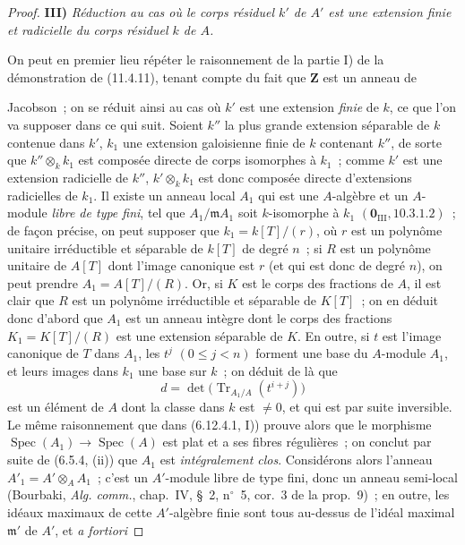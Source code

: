 \begin{proof}
\medskip
\noindent\textbf{III)} \emph{Réduction au cas où le corps résiduel $k'$ de
$A'$ est une extension finie et radicielle du corps résiduel $k$ de $A$.}

On peut en premier lieu répéter le raisonnement de la partie I) de la
démonstration de (11.4.11), tenant compte du fait que $\mathbf Z$ est un anneau
de


Jacobson~; on se réduit ainsi au cas où $k'$ est une extension \emph{finie} de
$k$, ce que l'on va supposer dans ce qui suit. Soient $k''$ la plus grande
extension séparable de $k$ contenue dans $k'$, $k_1$ une extension galoisienne
finie de $k$ contenant $k''$, de sorte que $k''\otimes_k k_1$ est composée
directe de corps isomorphes à $k_1$~; comme $k'$ est une extension radicielle de
$k''$, $k'\otimes_k k_1$ est donc composée directe d'extensions radicielles de
$k_1$. Il existe un anneau local $A_1$ qui est une $A$-algèbre et un $A$-module
\emph{libre de type fini}, tel que $A_1/\mathfrak m A_1$ soit $k$-isomorphe à
$k_1$ $(\mathbf 0_{\mathrm{III}},10.3.1.2)$~; de façon précise, on peut supposer
que $k_1=k[T]/(r)$, où $r$ est un polynôme unitaire irréductible et séparable de
$k[T]$ de degré $n$~; si $R$ est un polynôme unitaire de $A[T]$ dont l'image
canonique est $r$ (et qui est donc de degré $n$), on peut prendre
$A_1=A[T]/(R)$. Or, si $K$ est le corps des fractions de $A$, il est clair que
$R$ est un polynôme irréductible et séparable de $K[T]$~; on en déduit donc
d'abord que $A_1$ est un anneau intègre dont le corps des fractions
$K_1=K[T]/(R)$ est une extension séparable de $K$. En outre, si $t$ est l'image
canonique de $T$ dans $A_1$, les $t^j$ $(0\leq j<n)$ forment une base du
$A$-module $A_1$, et leurs images dans $k_1$ une base sur $k$~; on déduit de là
que
\[
d=\det\bigl(\operatorname{Tr}_{A_1/A}(t^{i+j})\bigr)
\]
est un élément de $A$ dont la classe dans $k$ est $\ne0$, et qui est par suite
inversible. Le même raisonnement que dans (6.12.4.1, I)) prouve alors que le
morphisme $\operatorname{Spec}(A_1)\to\operatorname{Spec}(A)$ est plat et a ses
fibres régulières~; on conclut par suite de (6.5.4, (ii)) que $A_1$ est
\emph{intégralement clos}. Considérons alors l'anneau
$A'_1=A'\otimes_A A_1$~; c'est un $A'$-module libre de type fini, donc un anneau
semi-local (Bourbaki, \emph{Alg. comm.}, chap.~IV, \S~2, n$^\circ$~5, cor.~3 de
la prop.~9)~; en outre, les idéaux maximaux de cette $A'$-algèbre finie sont
tous au-dessus de l'idéal maximal $\mathfrak m'$ de $A'$, et \emph{a fortiori}

\end{proof}

